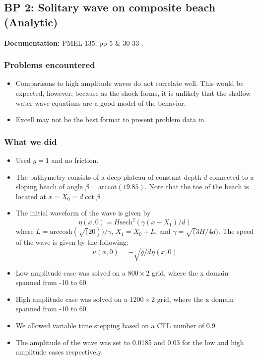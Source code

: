 \newsection

\subsection{BP 2:
 Solitary wave on composite beach (Analytic)}

{\bf Documentation:}  PMEL-135, pp 5 \& 30-33
\cite{SynolakisBernard:pmel135}.

\subsubsection{Problems encountered}

\begin{itemize}
\item Comparisons to high amplitude waves do not correlate well. This would be expected, however, because as the shock forms, it is unlikely that the shallow water wave equations are a good model of the behavior.
\item Excell may not be the best format to present problem data in. 
\end{itemize}

\subsubsection{What we did}

\begin{itemize}
\item Used $g=1$ and no friction.
\item The bathymetry consists of a deep plateau of constant depth $d$
connected to a sloping beach of angle $\beta = \text{arccot}(19.85)$. 
Note that the toe of the beach is located at $x = X_0 = d \cot \beta$
\item The initial waveform of the wave is given by 
\begin{equation}
\eta(x,0) = H \text{sech}^2(\gamma (x - X_1)/d)
\end{equation}
where $L = \text{arccosh}(\sqrt(20))/\gamma$, $X_1 = X_0 + L$, and $\gamma = \sqrt(3H/4d)$. The speed of the wave is given by the following: 
\begin{equation}
u(x,0)=-\sqrt{g/d}\eta(x,0)
\end{equation}
\item Low amplitude case was solved on a $800\times 2$ grid, where the x domain spanned from -10 to 60.
\item High amplitude case was solved on a $1200\times 2$ grid, where the x domain spanned from -10 to 60.
\item We allowed variable time stepping based on a CFL number of 0.9
\item The amplitude of the wave was set to 0.0185 and 0.03 for the low and high amplitude cases respectively. 
\end{itemize} 

